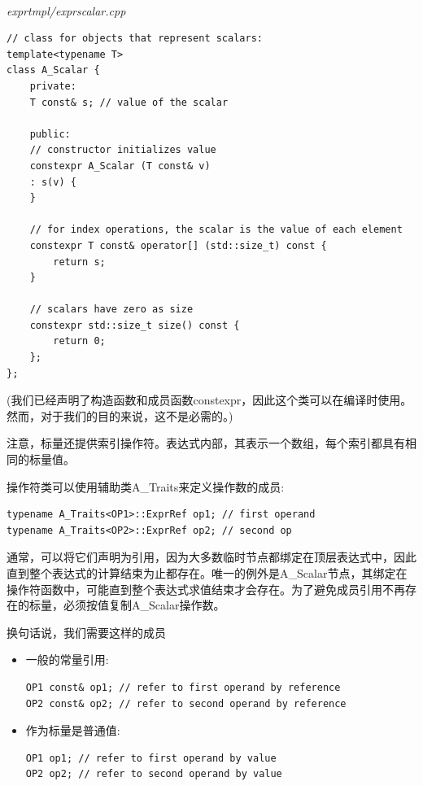 \hspace*{\fill} \\ %
\noindent
\textit{exprtmpl/exprscalar.cpp}
\begin{lstlisting}[style=styleCXX]
// class for objects that represent scalars:
template<typename T>
class A_Scalar {
	private:
	T const& s; // value of the scalar
	
	public:
	// constructor initializes value
	constexpr A_Scalar (T const& v)
	: s(v) {
	}

	// for index operations, the scalar is the value of each element
	constexpr T const& operator[] (std::size_t) const {
		return s;
	}

	// scalars have zero as size
	constexpr std::size_t size() const {
		return 0;
	};
};
\end{lstlisting}

(我们已经声明了构造函数和成员函数constexpr，因此这个类可以在编译时使用。然而，对于我们的目的来说，这不是必需的。)

注意，标量还提供索引操作符。表达式内部，其表示一个数组，每个索引都具有相同的标量值。

操作符类可以使用辅助类A\_Traits来定义操作数的成员:

\begin{lstlisting}[style=styleCXX]
typename A_Traits<OP1>::ExprRef op1; // first operand
typename A_Traits<OP2>::ExprRef op2; // second op
\end{lstlisting}

通常，可以将它们声明为引用，因为大多数临时节点都绑定在顶层表达式中，因此直到整个表达式的计算结束为止都存在。唯一的例外是A\_Scalar节点，其绑定在操作符函数中，可能直到整个表达式求值结束才会存在。为了避免成员引用不再存在的标量，必须按值复制A\_Scalar操作数。

换句话说，我们需要这样的成员

\begin{itemize}
\item 
一般的常量引用:
\begin{lstlisting}[style=styleCXX]
OP1 const& op1; // refer to first operand by reference
OP2 const& op2; // refer to second operand by reference
\end{lstlisting}

\item 
作为标量是普通值:
\begin{lstlisting}[style=styleCXX]
OP1 op1; // refer to first operand by value
OP2 op2; // refer to second operand by value
\end{lstlisting}
\end{itemize}

